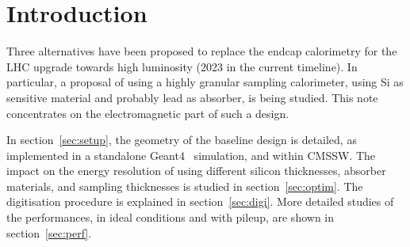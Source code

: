 \section{Introduction}
\label{sec:intro}

Three alternatives have been proposed to replace the endcap
calorimetry for the LHC upgrade towards high luminosity (2023 in the
current timeline). In particular, a proposal of using a highly
granular sampling calorimeter, using Si as sensitive material and
probably lead as absorber, is being studied. This note concentrates on
the electromagnetic part of such a design.

In section~\ref{sec:setup}, the geometry of the baseline design is
detailed, as implemented in a standalone Geant4~\cite{Agostinelli2003250}
simulation, and within CMSSW. The impact on the energy resolution of
using different silicon thicknesses, absorber materials, and sampling
thicknesses is studied in section~\ref{sec:optim}. The digitisation
procedure is explained in section~\ref{sec:digi}. More detailed
studies of the performances, in ideal conditions and with pileup, are
shown in section~\ref{sec:perf}.
